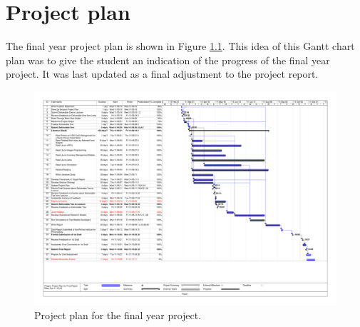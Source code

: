 \chapter{Project plan}
\label{ap:ProjectPlan}
\graphicspath{{Appendix5/Appendix5figures/}}
The final year project plan is shown in Figure \ref{fig:ProjectPlan}. This idea of this Gantt chart plan was to give the student an indication of the progress of the final year project. It was last updated as a final adjustment to the project report.


\begin{figure}
\centering
\includegraphics[scale=0.55, trim=35 54 35 35, clip, angle=90]{SkripsieProjectPlan_Final}
\caption{Project plan for the final year project.}
\label{fig:ProjectPlan}
\end{figure}


